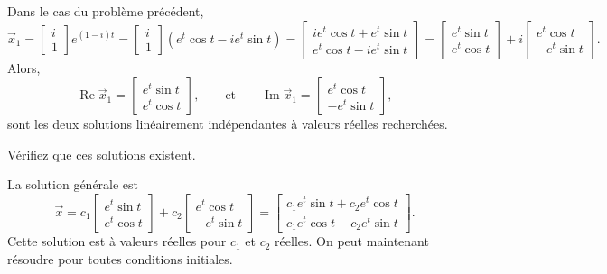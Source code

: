 Dans le cas du problème précédent,
\begin{equation*}
\vec{x}_1 =
\begin{bmatrix} i \\ 1 \end{bmatrix} e^{(1-i)t}
=
\begin{bmatrix} i \\ 1 \end{bmatrix} \left( e^t \cos t - i e^t \sin t \right)
=
\begin{bmatrix}
i e^t \cos t + e^t \sin t  \\
e^t \cos t - i e^t \sin t
\end{bmatrix}
=
\begin{bmatrix}
e^t \sin t  \\
e^t \cos t
\end{bmatrix}
+ i
\begin{bmatrix}
e^t \cos t  \\
- e^t \sin t
\end{bmatrix}
.
\end{equation*}
Alors, 
\begin{equation*}
\operatorname{Re} \vec{x}_1 = 
\begin{bmatrix}
e^t \sin t  \\
e^t \cos t
\end{bmatrix} ,
\qquad \text{et} \qquad
\operatorname{Im} \vec{x}_1 = 
\begin{bmatrix}
e^t \cos t \\
- e^t \sin t
\end{bmatrix} ,
\end{equation*}
sont les deux solutions linéairement indépendantes à valeurs réelles recherchées.

\begin{exercise}
Vérifiez que ces solutions existent.
\end{exercise}

La solution générale est
\begin{equation*}
\vec{x}
=
c_1
\begin{bmatrix}
e^t \sin t  \\
e^t \cos t
\end{bmatrix} 
+ c_2
\begin{bmatrix}
e^t \cos t \\
-e^t \sin t
\end{bmatrix} 
=
\begin{bmatrix}
c_1 e^t \sin t + c_2 e^t \cos t \\
c_1 e^t \cos t - c_2 e^t \sin t
\end{bmatrix} .
\end{equation*}
Cette solution est à valeurs réelles pour $c_1$ et $c_2$ réelles. On peut maintenant résoudre pour toutes conditions initiales.

